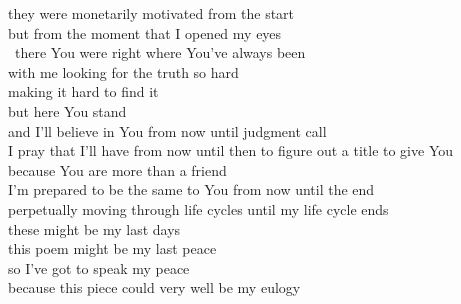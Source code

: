 \begin{Parallel}{0.48\textwidth}{0.48\textwidth}
{they were monetarily motivated from the start\\
but from the moment that I opened my eyes\\
\-\ \indent \indent there You were right where You’ve always been\\
with me looking for the truth so hard\\
making it hard to find it\\
but here You stand\\
and I’ll believe in You from now until judgment call\\
I pray that I’ll have from now until then to figure out a title to give You\\
because You are more than a friend\\
I’m prepared to be the same to You from now until the end\\
perpetually moving through life cycles until my life cycle ends\\
these might be my last days\\
this poem might be my last peace\\
so I’ve got to speak my peace\\
because this piece could very well be my eulogy}
\ParallelPar
\end{Parallel}